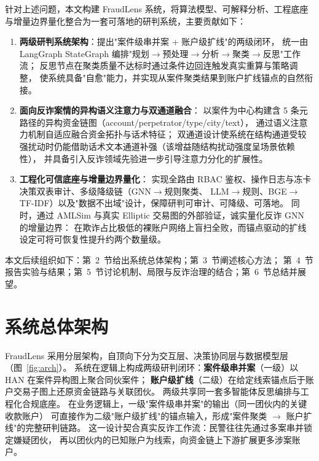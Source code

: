\documentclass[12pt,a4paper]{ctexart}
\begin{document}
针对上述问题，本文构建 FraudLens 系统，将算法模型、可解释分析、工程底座与增量边界量化整合为一套可落地的研判系统，主要贡献如下：
\begin{enumerate}
  \item \textbf{两级研判系统架构}：提出"案件级串并案 + 账户级扩线"的两级闭环，
    统一由 LangGraph StateGraph 编排"规划$\to$预处理$\to$分析$\to$聚类$\to$反思"工作流；
    反思节点在聚类质量不达标时通过条件边回连触发真实重算与策略调整，
    使系统具备"自愈"能力，并实现从案件聚类结果到账户扩线锚点的自然衔接。
  \item \textbf{面向反诈案情的异构语义注意力与双通道融合}：
    以案件为中心构建含 5 条元路径的异构资金链图（account/perpetrator/type/city/text），
    通过语义注意力机制自适应融合资金拓扑与话术特征；
    双通道设计使系统在结构通道受较强扰动时仍能借助话术文本通道补强（该增益随结构扰动强度呈场景依赖性），
    并具备引入反诈领域先验进一步引导注意力分化的扩展性。
  \item \textbf{工程化可信底座与增量边界量化}：
    实现全路由 RBAC 鉴权、操作日志与冻卡决策双表审计、多级降级链（GNN$\to$规则聚类、
    LLM$\to$规则、BGE$\to$TF-IDF）以及"数据不出域"设计，保障研判可审计、可降级、可落地。
    同时，通过 AMLSim 与真实 Elliptic 交易图的外部验证，诚实量化反诈 GNN 的增量边界：
    在欺诈占比极低的裸账户网络上盲扫全败，而锚点驱动的扩线设定可将可恢复性提升约两个数量级。
\end{enumerate}

本文后续组织如下：第~2~节给出系统总体架构；第~3~节阐述核心方法；
第~4~节报告实验与结果；第~5~节讨论机制、局限与反诈治理的结合；第~6~节总结并展望。

\section{系统总体架构}
\label{sec:arch}

FraudLens 采用分层架构，自顶向下分为交互层、决策协同层与数据模型层（图~\ref{fig:arch}）。
系统在逻辑上构成两级研判闭环：\textbf{案件级串并案}（一级）以 HAN 在案件异构图上聚合同伙案件；
\textbf{账户级扩线}（二级）在给定线索锚点后于账户交易子图上还原资金链路与关联团伙。
两级共享同一套多智能体反思编排与工程化合规底座。
在业务逻辑上，一级"案件级串并案"的输出（同一团伙内的关键收款账户）
可直接作为二级"账户级扩线"的锚点输入，形成"案件聚类 $\to$ 账户扩线"的完整研判链路。
这一设计契合真实反诈工作流：民警往往先通过多案串并锁定嫌疑团伙，
再以团伙内的已知账户为线索，向资金链上下游扩展更多涉案账户。
\end{document}
